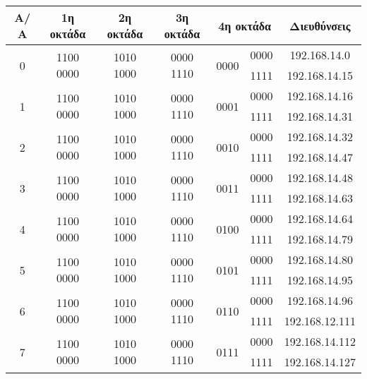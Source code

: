 \begin{center}
\fontsize{10}{12}
\ttfamily
\begin{tabular}{|c|c|c|c|c|c|c|}
\hline
                \textbf{Α/Α}  & \textbf{1η οκτάδα}  & \textbf{2η οκτάδα}  & \textbf{3η οκτάδα}  & \multicolumn{2}{c|}{\textbf{4η οκτάδα }}  & \textbf{Διευθύνσεις} \\ \hline

\multirow{2}{*}{0} &\multirow{2}{*}{1100 0000} & \multirow{2}{*}{1010 1000} & \multirow{2}{*}{0000 1110} & \multirow{2}{*}{0000}  & 0000 & 192.168.14.0 \\  \cline{6-7} 
                  & &  &  &                    & 1111 & 192.168.14.15  \\ \hline

\multirow{2}{*}{1} & \multirow{2}{*}{1100 0000}  & \multirow{2}{*}{1010 1000} & \multirow{2}{*}{0000 1110}  & \multirow{2}{*}{0001}  & 0000  & 192.168.14.16 \\  \cline{6-7} 
                  &  &  &  & & 1111 & 192.168.14.31 \\ \hline
\multirow{2}{*}{2} & \multirow{2}{*}{1100 0000}  & \multirow{2}{*}{1010 1000}  & \multirow{2}{*}{0000 1110} & \multirow{2}{*}{0010}  & 0000 & 192.168.14.32 \\  \cline{6-7} 
                  &  &  &  &    & 1111 & 192.168.14.47 \\ \hline
\multirow{2}{*}{3} & \multirow{2}{*}{1100 0000}  & \multirow{2}{*}{1010 1000} & \multirow{2}{*}{0000 1110}  & \multirow{2}{*}{0011}  & 0000 & 192.168.14.48 \\  
\cline{6-7} 
                  &  &   &  & & 1111 & 192.168.14.63 \\ \hline
\multirow{2}{*}{4} & \multirow{2}{*}{1100 0000} & \multirow{2}{*}{1010 1000}  & \multirow{2}{*}{0000 1110} & \multirow{2}{*}{0100}  & 0000 & 192.168.14.64 \\  \cline{6-7} 
                  &  &  &   & & 1111 & 192.168.14.79 \\ \hline
\multirow{2}{*}{5} & \multirow{2}{*}{1100 0000}  & \multirow{2}{*}{1010 1000}  & \multirow{2}{*}{0000 1110} & \multirow{2}{*}{0101}  & 0000 &  192.168.14.80 \\  
\cline{6-7} 
                  & & &  &  & 1111 &  192.168.14.95 \\ \hline
\multirow{2}{*}{6} & \multirow{2}{*}{1100 0000} &  \multirow{2}{*}{1010 1000} & \multirow{2}{*}{0000 1110} & \multirow{2}{*}{0110}  & 0000 & 192.168.14.96 \\  \cline{6-7} 
                  &  & &  &  & 1111 & 192.168.12.111 \\ \hline
\multirow{2}{*}{7} & \multirow{2}{*}{1100 0000}  & \multirow{2}{*}{1010 1000} & \multirow{2}{*}{0000 1110}  & \multirow{2}{*}{0111}  & 0000  &  192.168.14.112 \\  \cline{6-7} 
                  &  &  & & & 1111 & 192.168.14.127 \\ \hline
\end{tabular}
\normalfont
\end{center}


